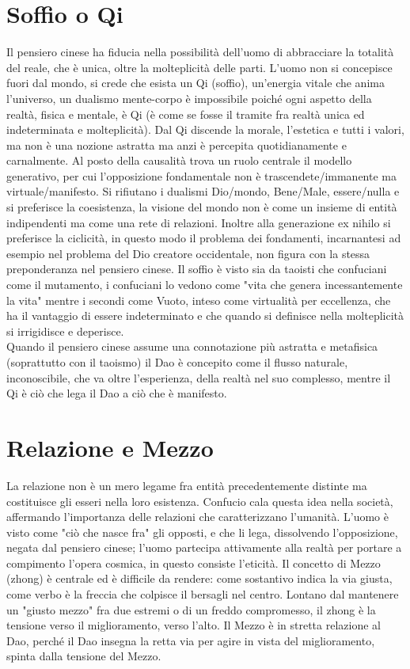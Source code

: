 \documentclass[10pt,a4paper]{report}
\begin{document}
\section{Soffio o Qi}
Il pensiero cinese ha fiducia nella possibilità dell'uomo di abbracciare la totalità del reale, che è unica, oltre la molteplicità delle parti. L'uomo non si concepisce fuori dal mondo, si crede che esista un Qi (soffio), un'energia vitale che anima l'universo, un dualismo mente-corpo è impossibile poiché ogni aspetto della realtà, fisica e mentale, è Qi (è come se fosse il tramite fra realtà unica ed indeterminata e molteplicità). Dal Qi discende la morale, l'estetica e tutti i valori, ma non è una nozione astratta ma anzi è percepita quotidianamente e carnalmente. 
Al posto della causalità trova un ruolo centrale il modello generativo, per cui l'opposizione fondamentale non è trascendete/immanente ma virtuale/manifesto. Si rifiutano i dualismi Dio/mondo, Bene/Male, essere/nulla e si preferisce la coesistenza, la visione del mondo non è come un insieme di entità indipendenti ma come una rete di relazioni. Inoltre alla generazione ex nihilo si preferisce la ciclicità, in questo modo il problema dei fondamenti, incarnantesi ad esempio nel problema del Dio creatore occidentale, non figura con la stessa preponderanza nel pensiero cinese. Il soffio è visto sia da taoisti che confuciani come il mutamento, i confuciani lo vedono come "vita che genera incessantemente la vita" mentre i secondi come Vuoto, inteso come virtualità per eccellenza, che ha il vantaggio di essere indeterminato e che quando si definisce nella molteplicità si irrigidisce e deperisce.\\
Quando il pensiero cinese assume una connotazione più astratta e metafisica (soprattutto con il taoismo) il Dao è concepito come il flusso naturale, inconoscibile, che va oltre l'esperienza, della realtà nel suo complesso, mentre il Qi è ciò che lega il Dao a ciò che è manifesto.  
\section{Relazione e Mezzo}
La relazione non è un mero legame fra entità precedentemente distinte ma costituisce gli esseri nella loro esistenza. Confucio cala questa idea nella società, affermando l'importanza delle relazioni che caratterizzano l'umanità. L'uomo è visto come "ciò che nasce fra" gli opposti, e che li lega, dissolvendo l'opposizione, negata dal pensiero cinese; l'uomo partecipa attivamente alla realtà per portare a compimento l'opera cosmica, in questo consiste l'eticità. Il concetto di Mezzo (zhong) è centrale ed è difficile da rendere: come sostantivo indica la via giusta, come verbo è la freccia che colpisce il bersagli nel centro. Lontano dal mantenere un "giusto mezzo" fra due estremi o di un freddo compromesso, il zhong è la tensione verso il miglioramento, verso l'alto. Il Mezzo è in stretta relazione al Dao, perché il Dao insegna la retta via per agire in vista del miglioramento, spinta dalla tensione del Mezzo.   
\end{document}
